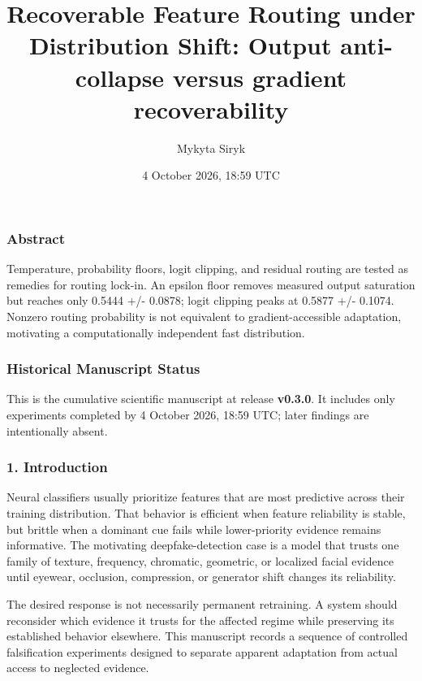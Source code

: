 \documentclass[
  10pt,
]{article}
\title{Recoverable Feature Routing under Distribution Shift: Output
anti-collapse versus gradient recoverability}
\author{Mykyta Siryk}
\date{4 October 2026, 18:59 UTC}
\begin{document}
\maketitle

\hypertarget{abstract}{%
\subsubsection{Abstract}\label{abstract}}

Temperature, probability floors, logit clipping, and residual routing
are tested as remedies for routing lock-in. An epsilon floor removes
measured output saturation but reaches only 0.5444 +/- 0.0878; logit
clipping peaks at 0.5877 +/- 0.1074. Nonzero routing probability is not
equivalent to gradient-accessible adaptation, motivating a
computationally independent fast distribution.

\hypertarget{historical-manuscript-status}{%
\subsubsection{Historical Manuscript
Status}\label{historical-manuscript-status}}

This is the cumulative scientific manuscript at release \textbf{v0.3.0}.
It includes only experiments completed by 4 October 2026, 18:59 UTC;
later findings are intentionally absent.

\hypertarget{introduction}{%
\subsubsection{1. Introduction}\label{introduction}}

Neural classifiers usually prioritize features that are most predictive
across their training distribution. That behavior is efficient when
feature reliability is stable, but brittle when a dominant cue fails
while lower-priority evidence remains informative. The motivating
deepfake-detection case is a model that trusts one family of texture,
frequency, chromatic, geometric, or localized facial evidence until
eyewear, occlusion, compression, or generator shift changes its
reliability.

The desired response is not necessarily permanent retraining. A system
should reconsider which evidence it trusts for the affected regime while
preserving its established behavior elsewhere. This manuscript records a
sequence of controlled falsification experiments designed to separate
apparent adaptation from actual access to neglected evidence.
\end{document}

